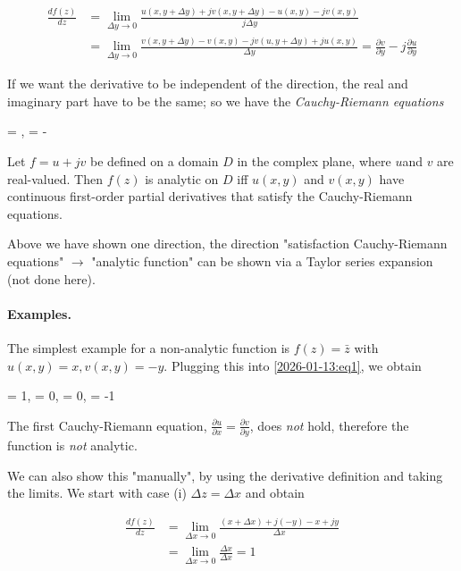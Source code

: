 \begin{align*}
\frac{df(z)}{dz} &= \lim_{\Delta y \rightarrow 0} \frac{u(x, y + \Delta y) + j v(x, y + \Delta y) - u(x, y) - j v(x, y) }{j \Delta y} \\
&= \lim_{\Delta y \rightarrow 0} \frac{v(x, y + \Delta y)  - v(x,y) - j v(u, y + \Delta y) + j u(x, y) }{\Delta y} = \frac{\partial v}{\partial y} - j \frac{\partial u}{\partial y}
\end{align*}

If we want the derivative to be independent of the direction, the real and imaginary part have to be the same; so we have the \emph{Cauchy-Riemann equations}

\be\label{2026-01-13:eq1}
 = , \quad {} = - 
\ee

\begin{theorem}
    Let $f = u + jv$ be defined on a domain $D$ in the complex plane, where $u$and $v$ are real-valued. Then $f(z)$ is analytic on $D$ iff $u(x,y)$ and $v(x,y)$ have continuous first-order partial derivatives that satisfy the Cauchy-Riemann equations.
\end{theorem}

Above we have shown one direction, the direction "satisfaction Cauchy-Riemann equations" $\rightarrow$ "analytic function" can be shown via a Taylor series expansion (not done here).


\paragraph{Examples.} The simplest example for a non-analytic function is $f(z) = \bar{z}$ with $u(x,y) = x, v(x,y) = -y$. Plugging this into \eqref{2026-01-13:eq1}, we obtain

\bee
     = 1, \quad {} = 0, \quad {} = 0, \quad {} = -1
\eee

The first Cauchy-Riemann equation, $\frac{\partial u}{\partial x} = \frac{\partial v}{\partial y}$, does \emph{not} hold, therefore the function is \emph{not} analytic.

We can also show this "manually", by using the derivative definition and taking the limits. We start with case (i) $\Delta z = \Delta x$ and obtain

\begin{align*}
\frac{df(z)}{dz} &= \lim_{\Delta x \rightarrow 0} \frac{(x + \Delta x) + j (-y) - x + j y }{\Delta x} \\
&= \lim_{\Delta x \rightarrow 0} \frac{\Delta x}{\Delta x} = 1
\end{align*}

